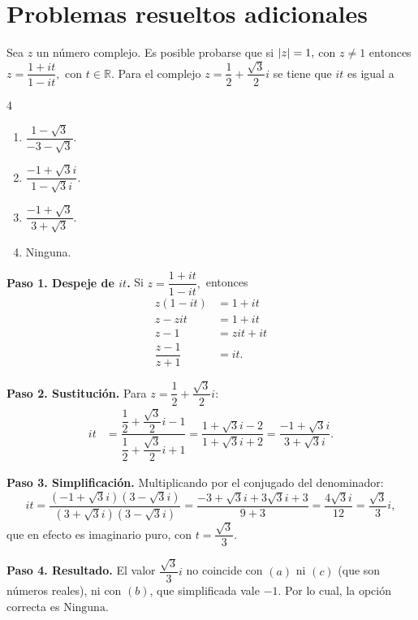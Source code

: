 \section{Problemas resueltos adicionales}


\begin{prob} Sea $z$ un número complejo. Es posible probarse que si $\left\vert z\right\vert=1,$ con $z\neq 1$ entonces $z=\dfrac{1+it}{1-it},$ con $t\in \mathbb{R}.$  Para el complejo $z=\dfrac{1}{2}+\dfrac{\sqrt{3}}{2}i$ se tiene que  $it$ es igual a %
				\begin{multicols}{4}
					\begin{enumerate}[$(a)$]
						\item $ \dfrac{ 1-\sqrt{3}}{-3-\sqrt{3}}.$  
						\item $ \dfrac{-1+\sqrt{3}i}{1-\sqrt{3}i}.$  
						\item $ \dfrac{-1+\sqrt{3}}{3+\sqrt{3}}.$  %
						\item Ninguna.
					\end{enumerate}
				\end{multicols}							
\begin{myproof}
\textbf{Paso 1. Despeje de $it$.} Si $z=\dfrac{1+it}{1-it},$ entonces
\begin{align*}
z\left( 1-it \right)&=1+it\\
z-zit&=1+it\\
z-1&=zit+it\\
\dfrac{z-1}{z+1}&=it.
\end{align*}

\textbf{Paso 2. Sustitución.} Para $z=\dfrac{1}{2}+\dfrac{\sqrt{3}}{2}i$:
\begin{align*} it&=\dfrac{\dfrac{1}{2}+\dfrac{\sqrt{3}}{2}i-1}{\dfrac{1}{2}+\dfrac{\sqrt{3}}{2}i+1}=\dfrac{1+\sqrt{3}i-2}{1+\sqrt{3}i+2}=\dfrac{-1+\sqrt{3}i}{3+\sqrt{3}i}.
\end{align*}

\textbf{Paso 3. Simplificación.} Multiplicando por el conjugado del denominador:
\[
it=\dfrac{(-1+\sqrt{3}i)(3-\sqrt{3}i)}{(3+\sqrt{3}i)(3-\sqrt{3}i)}=\dfrac{-3+\sqrt{3}i+3\sqrt{3}i+3}{9+3}=\dfrac{4\sqrt{3}i}{12}=\dfrac{\sqrt{3}}{3}i,
\]
que en efecto es imaginario puro, con $t=\dfrac{\sqrt{3}}{3}$.

\textbf{Paso 4. Resultado.} El valor $\dfrac{\sqrt{3}}{3}i$ no coincide con $(a)$ ni $(c)$ (que son números reales), ni con $(b)$, que simplificada vale $-1$. Por lo cual, la opción correcta es $\boxed{\text{Ninguna}}$.
\end{myproof}
\end{prob}

